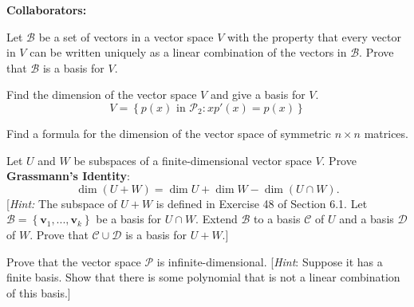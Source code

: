 \documentclass[11pt,letterpaper,boxed]{hmcpset}
\newcommand{\pn}[1]{\left( #1 \right)}
\newcommand{\crb}[1]{\left\{ #1 \right\}}
\newcommand{\VEC}[1]{\ensuremath{\mathbf{#1}}\xspace}
\begin{document}
\noindent\textbf{Collaborators:} 


\begin{problem}[Poole 6.2 \#30]
Let $\mathcal{B}$ be a set of vectors in a vector space $V$ with the property that
every vector in $V$ can be written uniquely as a linear combination of the vectors in $\mathcal{B}$. Prove that $\mathcal{B}$ is a basis for $V$.
\end{problem}

\begin{solution}
\vfill
\end{solution}
\newpage

\begin{problem}[Poole 6.2 \#36]
Find the dimension of the vector space $V$ and give a basis for $V$.
\[
	V = \crb{p(x) \text{ in } \mathcal{P}_2: xp'(x) = p(x)}
\]
\end{problem}

\begin{solution}
\vfill
\end{solution}
\newpage

\begin{problem}[Poole 6.2 \#40]
Find a formula for the dimension of the vector space
of symmetric $n \times n$ matrices.
\end{problem}

\begin{solution}
\vfill
\end{solution}
\newpage

\begin{problem}[Poole 6.2 \#42]
Let $U$ and $W$ be subspaces of a finite-dimensional
vector space $V$. Prove \textbf{Grassmann's Identity}:
\[
	\dim{\pn{U+W}}=\dim{U}+\dim{W}-\dim{\pn{U\cap W}}.
\]
[\textit{Hint:} The subspace of $U+W$ is defined in Exercise 48 of Section 6.1. Let
$\mathcal{B} = \crb{\VEC{v}_1,...,\VEC{v}_k}$ be a basis for $U \cap W$. Extend
$\mathcal{B}$ to a basis $\mathcal{C}$ of $U$ and a basis $\mathcal{D}$ of $W$. Prove
that $\mathcal{C}\cup\mathcal{D}$ is a basis for $U+W$.]
\end{problem}

\begin{solution}
\vfill
\end{solution}
\newpage

\begin{problem}[Poole 6.2 \#44]
Prove that the vector space $\mathcal{P}$ is infinite-dimensional. 
[\textit{Hint}: Suppose it has a finite basis. Show that there is some polynomial that is not a linear combination of this basis.]
\end{problem}
\end{document}
